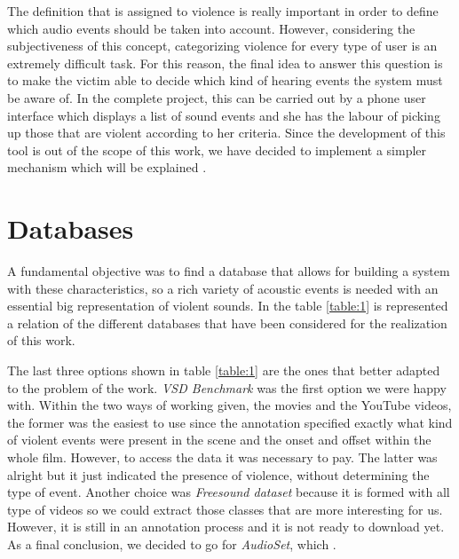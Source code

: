 	The definition that is assigned to violence is really important in order to define which audio events should be taken into account. However, considering the subjectiveness of this concept, categorizing violence for every type of user is an extremely difficult task. For this reason, the final idea to answer this question is to make the victim able to decide which kind of hearing events the system must be aware of. In the complete project, this can be carried out by a phone user interface which displays a list of sound events and she has the labour of picking up those that are violent according to her criteria. Since the development of this tool is out of the scope of this work, we have decided to implement a simpler mechanism which will be explained .
	
\section{Databases}

	A fundamental objective was to find a database that allows for building a system with these characteristics, so a rich variety of acoustic events is needed with an essential big representation of violent sounds. In the table \ref{table:1} is represented a relation of the different databases that have been considered for the realization of this work.
	
	
	
	The last three options shown in table \ref{table:1} are the ones that better adapted to the problem of the work. \textit{VSD Benchmark} was the first option we were happy with. Within the two ways of working given, the movies and the YouTube videos, the former was the easiest to use since the annotation specified exactly what kind of violent events were present in the scene and the onset and offset within the whole film. However, to access the data it was necessary to pay. The latter was alright but it just indicated the presence of violence, without determining the type of event. Another choice was \textit{Freesound dataset} because it is formed with all type of videos so we could extract those classes that are more interesting for us. However, it is still in an annotation process and it is not ready to download yet. As a final conclusion, we decided to go for \textit{AudioSet}, which .
	
	
